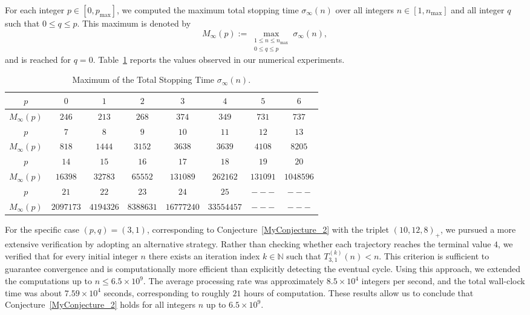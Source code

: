 \documentclass[11pt,a4paper]{article}
\begin{document}
For each integer $p \in [0,p_{\max}]$, we computed the maximum total stopping time $\sigma_{\infty}(n)$ over all integers $n \in [1,n_{\max}]$ and all integer $q$ such that $0 \le q \le p$.  This maximum is denoted by
$$
M_{\infty}(p) := \max_{\substack{1 \le n \le n_{\max} \\ 0 \le q \le p}} \sigma_{\infty}(n),
$$
and is reached  for $q=0$. Table~\ref{TableStoppingTime} reports the values observed in our numerical experiments.

\begin{table}\label{TableStoppingTime}
	\centering
	\begin{tabular}{|c|c|c|c|c|c|c|c|}
		\hline
		$p$&$0$&$1$&$2$&$3$&$4$&$5$&$6$ \\             
		\hline
		$M_{\infty}(p)$&$246$&$213$&$268$&$374$&$349$&$731$&$737$ \\
		\hline
		\hline
		 $p$&$7$&$8$&$9$&$10$&$11$&$12$&$13$\\
		 \hline
		 $M_{\infty}(p)$&$818$&$1444$&$3152$&$3638$&$3639$&$4108$&$8205$\\
		 \hline
		 \hline
		 $p$&$14$&$15$&$16$&$17$&$18$&$19$&$20$\\
		 \hline
		 $M_{\infty}(p)$&$16398$&$32783$&$65552$&$131089$&$262162$&$131091$&$1048596$\\
		 \hline
		 \hline
          $p$&$21$&$22$&$23$&$24$&$25$&$---$&$---$\\
		 \hline
		 $M_{\infty}(p)$&$2097173$&$4194326$&$8388631$&$16777240$&$33554457$&$---$&$---$\\
		 \hline
		 \end{tabular}
		 \caption{ Maximum of  the Total Stopping Time $\sigma_{\infty}(n)$.}
	 \end{table}
		 
	
		
		
		 
		 
		 








For the specific case $(p,q) = (3,1)$, corresponding to Conjecture~\ref{MyConjecture_2} with the triplet
$(10,12,8)_+$, we pursued a more extensive verification by adopting an alternative strategy.
Rather than checking whether each trajectory reaches the terminal value $4$, we verified that for every
initial integer $n$ there exists an iteration index $k \in \mathbb{N}$ such that
$T_{3,1}^{(k)}(n) < n$.
This criterion is sufficient to guarantee convergence and is computationally more efficient than
explicitly detecting the eventual cycle.
Using this approach, we extended the computations up to $n \leq  6.5\times 10^{9}$.
The average processing rate was approximately $8.5 \times 10^4$ integers per second, and the total
wall-clock time was about $7.59 \times 10^4$ seconds, corresponding to roughly $21$ hours of computation.
These results allow us to conclude that Conjecture~\ref{MyConjecture_2} holds for all integers
$n$ up to $6.5\times 10^{9}$.
\end{document}
